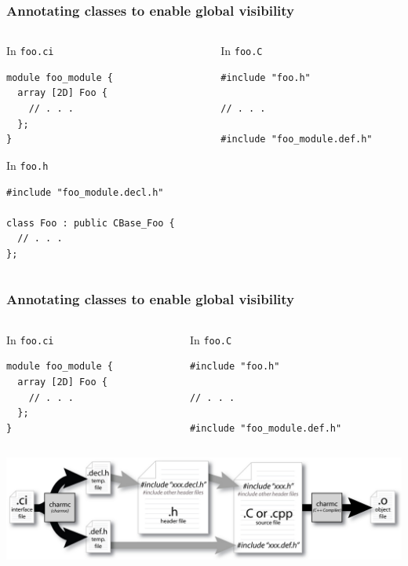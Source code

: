 \begin{frame}[fragile,t]
\frametitle{Annotating classes to enable global visibility}
\begin{columns}[t]
\begin{column}{0.4\textwidth}
\begin{block}{In \texttt{foo.ci}}
\begin{lstlisting}
module foo_module {
  array [2D] Foo {
    // . . .
  };
}
\end{lstlisting}
\end{block}
\begin{block}{In \texttt{foo.h}}
\begin{lstlisting}
#include "foo_module.decl.h"

class Foo : public CBase_Foo {
  // . . . 
};
\end{lstlisting}
\end{block}
\end{column}
\begin{column}{0.5\textwidth}
\begin{block}{In \texttt{foo.C}}
\begin{lstlisting}
#include "foo.h"

// . . . 

#include "foo_module.def.h"
\end{lstlisting}
\end{block}
\end{column}
\end{columns}
\end{frame}

\begin{frame}[fragile,t]
\frametitle{Annotating classes to enable global visibility}
\begin{columns}[t]
\begin{column}{0.4\textwidth}
\begin{block}{In \texttt{foo.ci}}
\begin{lstlisting}
module foo_module {
  array [2D] Foo {
    // . . .
  };
}
\end{lstlisting}
\end{block}
\end{column}
\begin{column}{0.5\textwidth}
\begin{block}{In \texttt{foo.C}}
\begin{lstlisting}
#include "foo.h"

// . . . 

#include "foo_module.def.h"
\end{lstlisting}
\end{block}
\end{column}
\end{columns}
\includegraphics[width=\textwidth]{../figures/charmCompile.jpg}
\end{frame}


